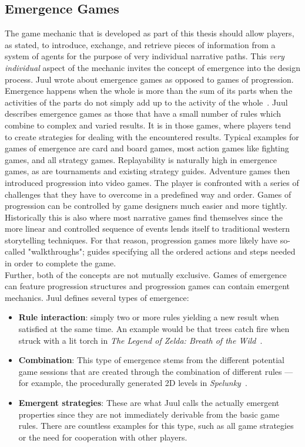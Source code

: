 \subsection{Emergence Games}
The game mechanic that is developed as part of this thesis should allow players, as stated, to introduce, exchange, and retrieve pieces of information from a system of agents for the purpose of very individual narrative paths. This \textit{very individual} aspect of the mechanic invites the concept of emergence into the design process. Juul wrote about emergence games as opposed to games of progression.\\
Emergence happens when the whole is more than the sum of its parts when the activities of the parts do not simply add up to the activity of the whole~\cite{Holland2000}. Juul describes emergence games as those that have a small number of rules which combine to complex and varied results. It is in those games, where players tend to create strategies for dealing with the encountered results. Typical examples for games of emergence are card and board games, most action games like fighting games, and all strategy games. Replayability is naturally high in emergence games, as are tournaments and existing strategy guides. Adventure games then introduced progression into video games. The player is confronted with a series of challenges that they have to overcome in a predefined way and order. Games of progression can be controlled by game designers much easier and more tightly. Historically this is also where most narrative games find themselves since the more linear and controlled sequence of events lends itself to traditional western storytelling techniques. For that reason, progression games more likely have so-called "walkthroughs"; guides specifying all the ordered actions and steps needed in order to complete the game.~\cite{Juul2002}\\
Further, both of the concepts are not mutually exclusive. Games of emergence can feature progression structures and progression games can contain emergent mechanics. Juul defines several types of emergence:
\begin{itemize}
	\item \textbf{Rule interaction}: simply two or more rules yielding a new result when satisfied at the same time. An example would be that trees catch fire when struck with a lit torch in \textit{The Legend of Zelda: Breath of the Wild}~\cite{zeldabotw}.
	\item \textbf{Combination}: This type of emergence stems from the different potential game sessions that are created through the combination of different rules — for example, the procedurally generated 2D levels in \textit{Spelunky}~\cite{spelunky}.
	\item \textbf{Emergent strategies}: These are what Juul calls the actually emergent properties since they are not immediately derivable from the basic game rules. There are countless examples for this type, such as all game strategies or the need for cooperation with other players.
\end{itemize} 

